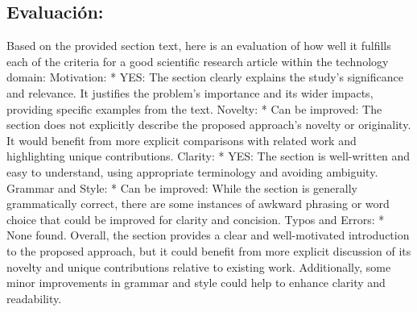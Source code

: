 \documentclass{article}%
\begin{document}
%
\subsection{Evaluación:}%
\label{subsec:Evaluacin}%
\newline%
Based on the provided section text, here is an evaluation of how well it fulfills each of the criteria for a good scientific research article within the technology domain:\newline%
\newline%
Motivation:\newline%
\newline%
* YES: The section clearly explains the study's significance and relevance. It justifies the problem's importance and its wider impacts, providing specific examples from the text.\newline%
\newline%
Novelty:\newline%
\newline%
* Can be improved: The section does not explicitly describe the proposed approach's novelty or originality. It would benefit from more explicit comparisons with related work and highlighting unique contributions.\newline%
\newline%
Clarity:\newline%
\newline%
* YES: The section is well{-}written and easy to understand, using appropriate terminology and avoiding ambiguity.\newline%
\newline%
Grammar and Style:\newline%
\newline%
* Can be improved: While the section is generally grammatically correct, there are some instances of awkward phrasing or word choice that could be improved for clarity and concision.\newline%
\newline%
Typos and Errors:\newline%
\newline%
* None found.\newline%
\newline%
Overall, the section provides a clear and well{-}motivated introduction to the proposed approach, but it could benefit from more explicit discussion of its novelty and unique contributions relative to existing work. Additionally, some minor improvements in grammar and style could help to enhance clarity and readability.
\end{document}
